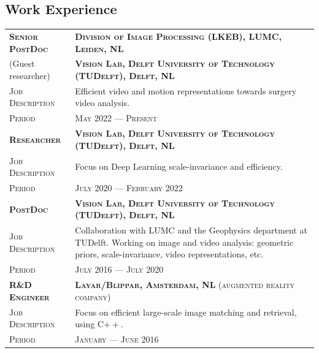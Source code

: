 \documentclass[a4paper, oneside, final]{scrartcl}
\newcommand{\gray}{\rowcolor[gray]{.90}}
\begin{document}
\begin{center}
		\section{Work Experience}
        \begin{tabular}{p{3.5cm}@{\hskip 0.3in}p{12.3cm}}
			\gray \textsc{\textbf{Senior PostDoc}} & \textsc{\textbf{Division of Image Processing (LKEB), LUMC, Leiden, NL}}\\
            \gray (Guest researcher)               & \textsc{\textbf{Vision Lab, Delft University of Technology (TUDelft), Delft, NL}}\\
			\textsc{Job Description}               & Efficient video and motion representations towards surgery video analysis.\\ 
			\textsc{Period}                        & \textsc{May 2022 --- Present} 
            \vspace{5px}\\
			\gray \textsc{\textbf{Researcher}} & \textsc{\textbf{Vision Lab, Delft University of Technology (TUDelft), Delft, NL}}\\
			\textsc{Job Description}            & Focus on Deep Learning scale-invariance and efficiency.\\
			\textsc{Period}                     & \textsc{July 2020 --- February 2022} 
            \vspace{5px}\\
			\gray \textsc{\textbf{PostDoc}}     & \textsc{\textbf{Vision Lab, Delft University of Technology (TUDelft), Delft, NL}}\\
			\textsc{Job Description}            & Collaboration with LUMC and the Geophysics department at TUDelft.
                                                Working on image and video analysis: geometric priors, scale-invariance, video representations, etc.\\
			\textsc{Period}                     & \textsc{July 2016 --- July 2020} 
            \vspace{5px}\\
            \gray \textsc{\textbf{R\&D Engineer}}   & \textsc{\textbf{Layar\slash Blippar, Amsterdam, NL} (augmented reality company)}\\
            \textsc{Job Description}                & Focus on efficient large-scale image matching and retrieval, using C${++}$.\\
			\textsc{Period}                         & \textsc{January --- June 2016} 
		\end{tabular}

\end{center}
\end{document}
